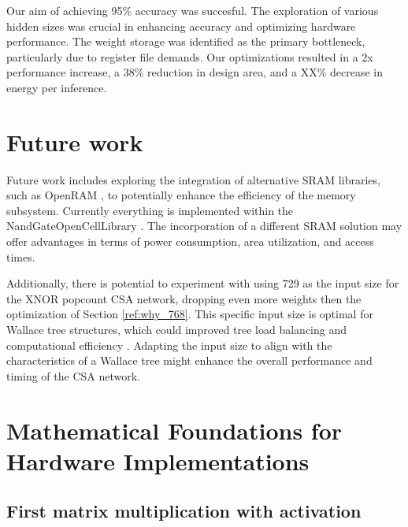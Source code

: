 \documentclass[conference]{IEEEtran}
\begin{document}
Our aim of achieving 95\% accuracy was succesful. 
The exploration of various hidden sizes was crucial in enhancing accuracy and optimizing hardware performance. The weight storage was identified as the primary bottleneck, particularly due to register file demands. Our optimizations resulted in a 2x performance increase, a 38\% reduction in design area, and a XX\% decrease in energy per inference.


\section{Future work}
\label{sec:future}

Future work includes exploring the integration of alternative SRAM libraries, such as OpenRAM \cite{openram}, to potentially enhance the efficiency of the memory subsystem. Currently everything is implemented within the NandGateOpenCellLibrary \cite{nangate_lib}. The incorporation of a different SRAM solution may offer advantages in terms of power consumption, area utilization, and access times.

Additionally, there is potential to experiment with using 729 as the input size for the XNOR popcount CSA network, dropping even more weights then the optimization of Section \ref{ref:why_768}. This specific input size is optimal for Wallace tree structures, which could improved tree load balancing and computational efficiency \cite{wallace} . Adapting the input size to align with the characteristics of a Wallace tree might enhance the overall performance and timing of the CSA network.

\newpage

\printbibliography

\newpage
\clearpage

\appendix
\label{appendix}

\section{Mathematical Foundations for Hardware Implementations}

\label{appendix:bnn_maths}

\subsection{First matrix multiplication with activation}
\end{document}
